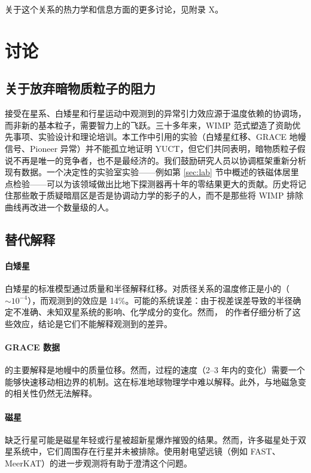 \documentclass[12pt]{article}
\theoremstyle{remark}
\begin{document}
	关于这个关系的热力学和信息方面的更多讨论，见附录 X。
	
	\section{讨论}
	\label{sec:discussion}
	
	\subsection{关于放弃暗物质粒子的阻力}
	\label{subsec:on-reluctance}
	
	接受在星系、白矮星和行星运动中观测到的异常引力效应源于温度依赖的协调场，而非新的基本粒子，需要智力上的飞跃。三十多年来，WIMP 范式塑造了资助优先事项、实验设计和理论培训。本工作中引用的实验（白矮星红移、GRACE 地幔信号、Pioneer 异常）并不能孤立地证明 YUCT，但它们共同表明，暗物质粒子假说不再是唯一的竞争者，也不是最经济的。我们鼓励研究人员以协调框架重新分析现有数据。一个决定性的实验室实验——例如第 \ref{sec:lab} 节中概述的铁磁体居里点检验——可以为该领域做出比地下探测器再十年的零结果更大的贡献。历史将记住那些敢于质疑暗扇区是否是协调动力学的影子的人，而不是那些将 WIMP 排除曲线再改进一个数量级的人。
	
	\subsection{替代解释}
	\label{subsec:discussion-alternatives}
	
	\paragraph{白矮星}
	白矮星的标准模型通过质量和半径解释红移。对质径关系的温度修正是小的（$\sim 10^{-4}$），而观测到的效应是 14\%。可能的系统误差：由于视差误差导致的半径确定不准确、未知双星系统的影响、化学成分的变化。然而，\cite{Crumpler2024} 的作者仔细分析了这些效应，结论是它们不能解释观测到的差异。
	
	\paragraph{GRACE 数据}
	\cite{Rosat2025} 的主要解释是地幔中的质量位移。然而，过程的速度（2–3 年内的变化）需要一个能够快速移动相边界的机制。这在标准地球物理学中难以解释。此外，与地磁急变的相关性仍然无法解释。
	
	\paragraph{磁星}
	缺乏行星可能是磁星年轻或行星被超新星爆炸摧毁的结果。然而，许多磁星处于双星系统中，它们周围存在行星并未被排除。使用射电望远镜（例如 FAST、MeerKAT）的进一步观测将有助于澄清这个问题。
	
\end{document}
